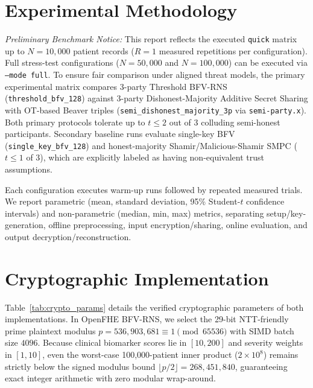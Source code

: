 \documentclass[conference]{IEEEtran}
\begin{document}
\section{Experimental Methodology}
\textit{Preliminary Benchmark Notice:} This report reflects the executed \texttt{quick} matrix up to $N=10,000$ patient records ($R=1$ measured repetitions per configuration). Full stress-test configurations ($N=50,000$ and $N=100,000$) can be executed via \texttt{--mode full}.
To ensure fair comparison under aligned threat models, the primary experimental matrix compares 3-party Threshold BFV-RNS (\texttt{threshold\_bfv\_128}) against 3-party Dishonest-Majority Additive Secret Sharing with OT-based Beaver triples (\texttt{semi\_dishonest\_majority\_3p} via \texttt{semi-party.x}). Both primary protocols tolerate up to $t \le 2$ out of $3$ colluding semi-honest participants. Secondary baseline runs evaluate single-key BFV (\texttt{single\_key\_bfv\_128}) and honest-majority Shamir/Malicious-Shamir SMPC ($t \le 1$ of $3$), which are explicitly labeled as having non-equivalent trust assumptions.

Each configuration executes warm-up runs followed by repeated measured trials. We report parametric (mean, standard deviation, 95\% Student-$t$ confidence intervals) and non-parametric (median, min, max) metrics, separating setup/key-generation, offline preprocessing, input encryption/sharing, online evaluation, and output decryption/reconstruction.

\section{Cryptographic Implementation}
Table~\ref{tab:crypto_params} details the verified cryptographic parameters of both implementations. In OpenFHE BFV-RNS, we select the 29-bit NTT-friendly prime plaintext modulus $p = 536,903,681 \equiv 1 \pmod{65536}$ with SIMD batch size $4096$. Because clinical biomarker scores lie in $[10, 200]$ and severity weights in $[1, 10]$, even the worst-case 100,000-patient inner product ($2 \times 10^8$) remains strictly below the signed modulus bound $\lfloor p/2 \rfloor = 268,451,840$, guaranteeing exact integer arithmetic with zero modular wrap-around.
\end{document}
